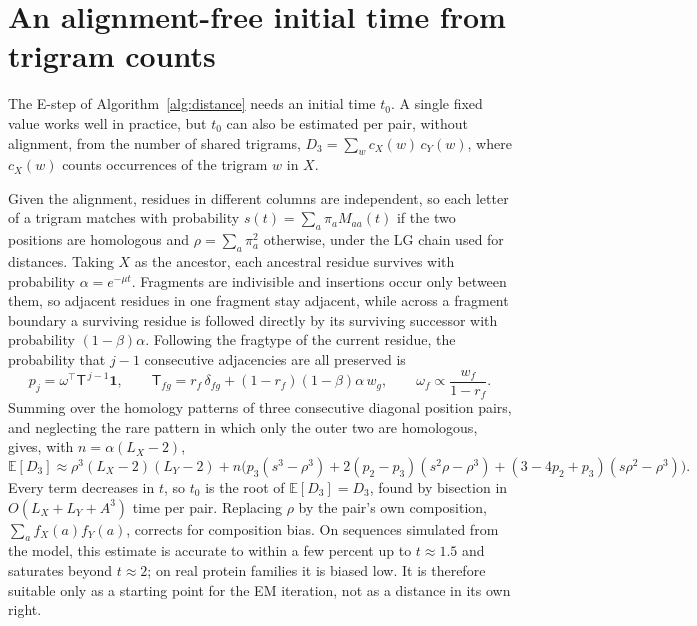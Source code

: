 \documentclass[11pt]{article}
\newcommand{\E}{\mathbb E}
\begin{document}
\section{An alignment-free initial time from trigram counts}
\label{app:kgram}

The E-step of Algorithm~\ref{alg:distance} needs an initial time $t_0$. A
single fixed value works well in practice, but $t_0$ can also be estimated
per pair, without alignment, from the number of shared trigrams,
$D_3=\sum_wc_X(w)\,c_Y(w)$, where $c_X(w)$ counts occurrences of the trigram
$w$ in $X$.

Given the alignment, residues in different columns are independent, so each
letter of a trigram matches with probability
$s(t)=\sum_a\pi_aM_{aa}(t)$ if the two positions are homologous and
$\rho=\sum_a\pi_a^2$ otherwise, under the LG chain used for distances. Taking $X$ as the ancestor, each
ancestral residue survives with probability $\alpha=e^{-\mu t}$. Fragments
are indivisible and insertions occur only between them, so adjacent residues
in one fragment stay adjacent, while across a fragment boundary a surviving
residue is followed directly by its surviving successor with probability
$(1-\beta)\alpha$. Following the fragtype of the current residue, the
probability that $j-1$ consecutive adjacencies are all preserved is
\[
p_j=\omega^\top\mathsf T^{\,j-1}\mathbf 1,\qquad
\mathsf T_{fg}=r_f\,\delta_{fg}+(1-r_f)(1-\beta)\alpha\,w_g,\qquad
\omega_f\propto\frac{w_f}{1-r_f}.
\]
Summing over the homology patterns of three consecutive diagonal position
pairs, and neglecting the rare pattern in which only the outer two are
homologous, gives, with $n=\alpha(L_X-2)$,
\[
\E[D_3]\approx\rho^3(L_X-2)(L_Y-2)
+n\Big(p_3(s^3-\rho^3)+2(p_2-p_3)(s^2\rho-\rho^3)
+(3-4p_2+p_3)(s\rho^2-\rho^3)\Big).
\]
Every term decreases in $t$, so $t_0$ is the root of $\E[D_3]=D_3$, found by
bisection in $O(L_X+L_Y+A^3)$ time per pair. Replacing $\rho$ by the pair's
own composition, $\sum_af_X(a)f_Y(a)$, corrects for composition bias. On
sequences simulated from the model, this estimate is accurate to within a
few percent up to $t\approx1.5$ and saturates beyond $t\approx2$; on real
protein families it is biased low. It is therefore suitable only as a
starting point for the EM iteration, not as a distance in its own right.
\end{document}
